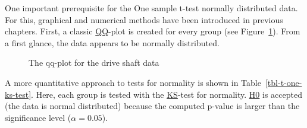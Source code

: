 \documentclass[
  a4paper,
]{scrbook}
\begin{document}
One important prerequisite for the One sample t-test normally
distributed data. For this, graphical and numerical methods have been
introduced in previous chapters. First, a classic \hyperref[qq]{QQ}-plot
is created for every group (see Figure~\ref{fig-t-one-qq}). From a first
glance, the data appears to be normally distributed.

\begin{figure}[ht]


\caption{\label{fig-t-one-qq}The qq-plot for the drive shaft data}

\end{figure}%

A more quantitative approach to tests for normality is shown in
Table~\ref{tbl-t-one-ks-test}. Here, each group is tested with the
\hyperref[KS]{KS}-test for normality. \hyperref[H0]{H0} is accepted (the
data is normal distributed) because the computed p-value is larger than
the significance level (\(\alpha  = 0.05\)).
\end{document}
